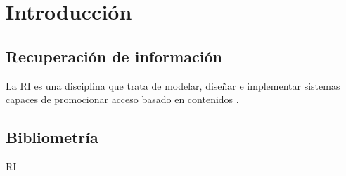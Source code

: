 \chapter*{}
\chapter{Introducción}
\section{Recuperación de información}
La \acrfull{RI} es una disciplina que trata de modelar, diseñar e implementar sistemas capaces de promocionar acceso basado en contenidos \cite{RI}.
\section{Bibliometría}


\newpage

\acrshort{RI}